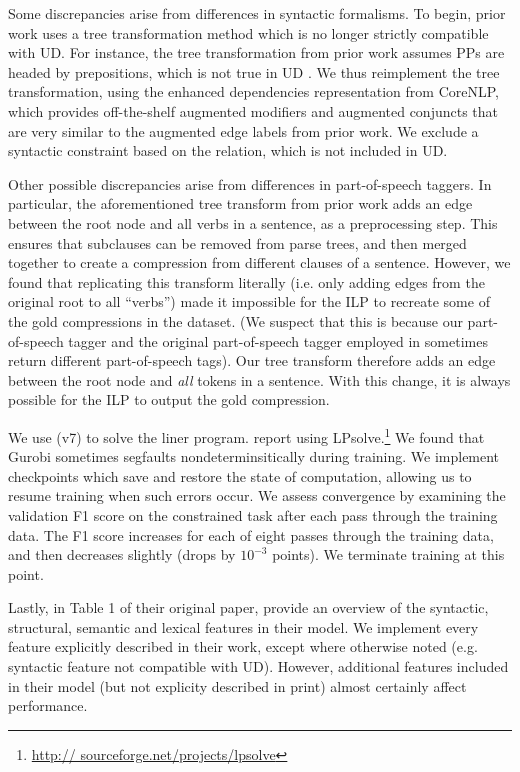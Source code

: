 Some discrepancies arise from differences in syntactic formalisms. To begin, prior work uses a tree transformation method which is no longer strictly compatible with UD. For instance, the tree transformation from prior work assumes PPs are headed by prepositions, which is not true in UD \cite{Schuster2016EnhancedEU}. We thus reimplement the tree transformation, using the enhanced dependencies representation from CoreNLP, which provides off-the-shelf augmented modifiers and augmented conjuncts that are very similar to the augmented edge labels from prior work. We exclude a syntactic constraint based on the  relation, which is not included in UD.

Other possible discrepancies arise from differences in part-of-speech taggers. In particular, the aforementioned tree transform from prior work adds an edge between the root node and all verbs in a sentence, as a preprocessing step. This ensures that subclauses can be removed from parse trees, and then merged together to create a compression from different clauses of a sentence. However, we found that replicating this transform literally (i.e. only adding edges from the original root to all ``verbs'') made it impossible for the ILP to recreate some of the gold compressions in the dataset. (We suspect that this is because our part-of-speech tagger and the original part-of-speech tagger employed in \citet{filippova2013overcoming} sometimes return different part-of-speech tags). Our tree transform therefore adds an edge between the root node and \textit{all} tokens in a sentence. With this change, it is always possible for the ILP to output the gold compression.

We use \citet{gurobi} (v7) to solve the liner program. \citet{filippova2008dependency} report using LPsolve.\footnote{\url{http://
sourceforge.net/projects/lpsolve}}  We found that Gurobi sometimes segfaults nondeterminsitically during training. We implement checkpoints which save and restore the state of computation, allowing us to resume training when such errors occur.  We assess convergence by examining the validation F1 score on the constrained task after each pass through the training data. The F1 score increases for each of eight passes through the training data, and then decreases slightly (drops by $10^{-3}$ points). We terminate training at this point. 

Lastly, in Table 1 of their original paper, \citet{filippova2013overcoming} provide an overview of the syntactic, structural, semantic and lexical features in their model. We implement every feature explicitly described in their work, except where otherwise noted (e.g. syntactic feature not compatible with UD). However, additional features included in their model (but not explicity described in print) almost certainly affect performance. 

